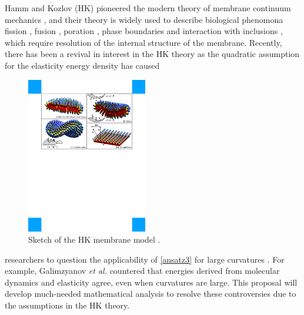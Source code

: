 Hamm and Kozlov (HK) pioneered 
the modern theory of membrane continuum mechanics \cite{Hamm2000}, and their theory
is widely used to describe biological phenomona 
fission \cite{FrEsAkSh15, Maetal15, PhysRevE.79.031926},
fusion \cite{ChKo08, KoKo2002,Kuzmin7235,Aeffner2012},
poration \cite{Gaetal20}, phase boundaries and interaction with inclusions
\cite{SeLeMaEg17,Saetal20, Pietal20}, which require resolution of the internal structure of the membrane.  
Recently, there has been a revival in interest in the HK theory as the quadratic assumption
for the elasticity energy density has caused
%
\begin{figure}
\centerline{\includegraphics[width=0.47\textwidth]{Figures/Deformations.pdf}}
\caption{\label{fig:deformations}Sketch of the HK membrane model \cite{Hamm2000}.
    }
\end{figure}
%
 researchers to question the applicability of \eqref{ansatz3} for large curvatures \cite{PhysRevLett.117.188102, ARGUDO20161619}. 
For example, Galimzyanov {\it et al.} \cite{C9SM02079A} countered that energies derived from molecular dynamics and elasticity agree, even when curvatures are large.
This proposal will develop much-needed mathematical analysis to resolve these controversies due to the assumptions in the HK theory. 

